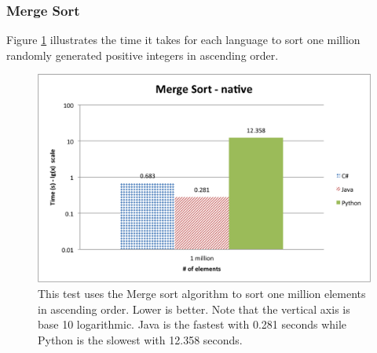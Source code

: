\subsubsection{Merge Sort}

Figure \ref{fig:native_merge_sort} illustrates the time it takes for each language to sort one million randomly generated positive integers in ascending order.

\begin{figure}[h]
	\centering
	\includegraphics[width=1.0\linewidth]{chapters/new_media/MergeSortNative.png}
	\caption{This test uses the Merge sort algorithm to sort one million elements in ascending order. Lower is better. Note that the vertical axis is base 10 logarithmic. Java is the fastest with 0.281 seconds while Python is the slowest with 12.358 seconds.}
	\label{fig:native_merge_sort}
\end{figure}
